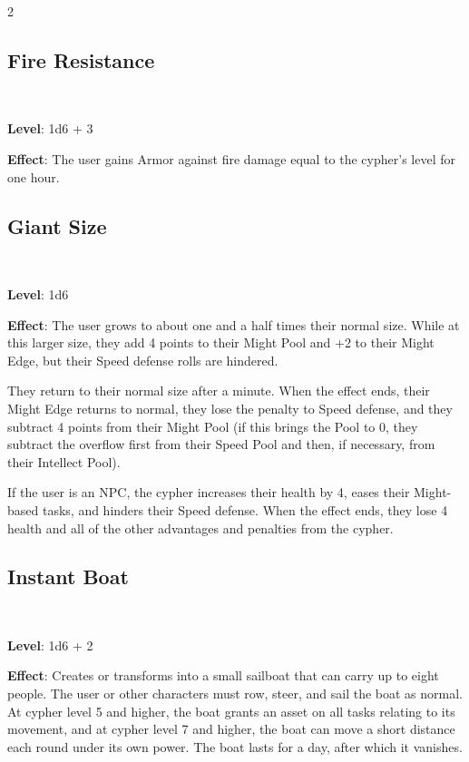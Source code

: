 \begin{multicols}{2}
\subsection{Fire Resistance}

\textbf{Level}: 1d6 + 3 

\textbf{Effect}: The user gains Armor against fire damage equal to the cypher’s level for one hour.

\subsection{Giant Size}

\textbf{Level}: 1d6 

\textbf{Effect}: The user grows to about one and a half times their normal size. While at this larger size, they add 4 points to their Might Pool and +2 to their Might Edge, but their Speed defense rolls are hindered. 

They return to their normal size after a minute. When the effect ends, their Might Edge returns to normal, they lose the penalty to Speed defense, and they subtract 4 points from their Might Pool (if this brings the Pool to 0, they subtract the overflow first from their Speed Pool and then, if necessary, from their Intellect Pool). 

If the user is an NPC, the cypher increases their health by 4, eases their Might-based tasks, and hinders their Speed defense. When the effect ends, they lose 4 health and all of the other advantages and penalties from the cypher. 

\subsection{Instant Boat}

\textbf{Level}: 1d6 + 2 

\textbf{Effect}: Creates or transforms into a small sailboat that can carry up to eight people. The user or other characters must row, steer, and sail the boat as normal. At cypher level 5 and higher, the boat grants an asset on all tasks relating to its movement, and at cypher level 7 and higher, the boat can move a short distance each round under its own power. The boat lasts for a day, after which it vanishes.


\end{multicols}

